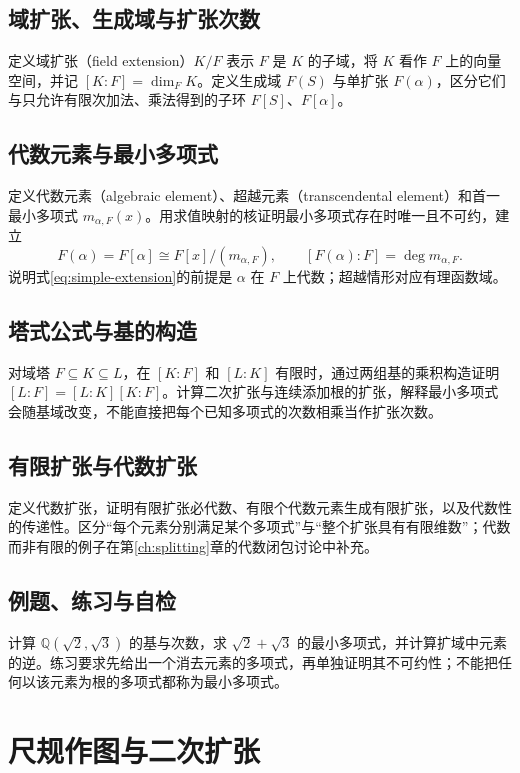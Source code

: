 \documentclass[UTF8,12pt,a4paper,fontset=fandol]{ctexbook}
\begin{document}
\section{域扩张、生成域与扩张次数}
定义域扩张（field extension）$K/F$ 表示 $F$ 是 $K$ 的子域，将 $K$ 看作 $F$ 上的向量空间，并记 $[K:F]=\dim_FK$。定义生成域 $F(S)$ 与单扩张 $F(\alpha)$，区分它们与只允许有限次加法、乘法得到的子环 $F[S]$、$F[\alpha]$。

\section{代数元素与最小多项式}
定义代数元素（algebraic element）、超越元素（transcendental element）和首一最小多项式 $m_{\alpha,F}(x)$。用求值映射的核证明最小多项式存在时唯一且不可约，建立
\begin{equation}\label{eq:simple-extension}
  F(\alpha)=F[\alpha]\cong F[x]/(m_{\alpha,F}),
  \qquad [F(\alpha):F]=\deg m_{\alpha,F}.
\end{equation}
说明式\eqref{eq:simple-extension}的前提是 $\alpha$ 在 $F$ 上代数；超越情形对应有理函数域。

\section{塔式公式与基的构造}
对域塔 $F\subseteq K\subseteq L$，在 $[K:F]$ 和 $[L:K]$ 有限时，通过两组基的乘积构造证明 $[L:F]=[L:K][K:F]$。计算二次扩张与连续添加根的扩张，解释最小多项式会随基域改变，不能直接把每个已知多项式的次数相乘当作扩张次数。

\section{有限扩张与代数扩张}
定义代数扩张，证明有限扩张必代数、有限个代数元素生成有限扩张，以及代数性的传递性。区分“每个元素分别满足某个多项式”与“整个扩张具有有限维数”；代数而非有限的例子在第\ref{ch:splitting}章的代数闭包讨论中补充。

\section{例题、练习与自检}
计算 $\mathbb Q(\sqrt2,\sqrt3)$ 的基与次数，求 $\sqrt2+\sqrt3$ 的最小多项式，并计算扩域中元素的逆。练习要求先给出一个消去元素的多项式，再单独证明其不可约性；不能把任何以该元素为根的多项式都称为最小多项式。

\chapter{尺规作图与二次扩张}\label{ch:constructions}
\end{document}
